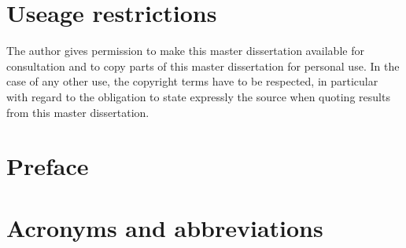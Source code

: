 \documentclass[11pt,british]{article}
\begin{document}
\newpage
\thispagestyle{empty}
\mbox{}




\newpage{}\part*{Useage restrictions}

The author gives permission to make this master dissertation available for consultation 
and to copy parts of this master dissertation for personal use. 
 In the case of any other use, the copyright terms have to be respected, in particular with regard to 
the obligation to state expressly the source when quoting results from this master dissertation.

\pagebreak{}


\newpage{}\part*{Preface}

\pagebreak{}


\newpage{}
\begin{abstract}
\end{abstract}





\tableofcontents
\pagebreak


\listoffigures
\pagebreak


\listoftables
\pagebreak


\part*{Acronyms and abbreviations}
\pagebreak
\end{document}

